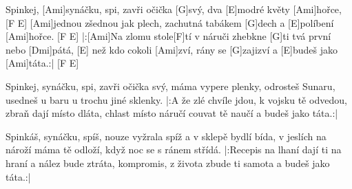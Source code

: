 
\sloka
Spinkej, [Ami]synáčku, spi, zavři očička [G]svý,
dva [E]modré květy [Ami]hořce, [F E]
[Ami]jednou zšednou jak plech, zachutná tabákem [G]dech
a [E]políbení [Ami]hořce. [F E]
|:[Ami]Na zlomu stole[F]tí v náruči zhebkne [G]ti
tvá první nebo [Dmi]pátá, [E]
než kdo cokoli [Ami]zví, rány se [G]zajizví
a [E]budeš jako [Ami]táta.:| [F E]

\sloka
Spinkej, synáčku, spi, zavři očička svý,
máma vypere plenky,
odrosteš Sunaru, usedneš u baru
u trochu jiné sklenky.
|:A že zlé chvíle jdou, k vojsku tě odvedou,
zbraň dají místo dláta,
chlast místo náručí couvat tě naučí
a budeš jako táta.:|

\sloka
Spinkáš, synáčku, spíš, nouze vyžrala spíž
a v sklepě bydlí bída,
v jeslích na nároží máma tě odloží,
když noc se s ránem střídá.
|:Recepis na lhaní dají ti na hraní
a nález bude ztráta,
kompromis, z života zbude ti samota
a budeš jako táta.:|
